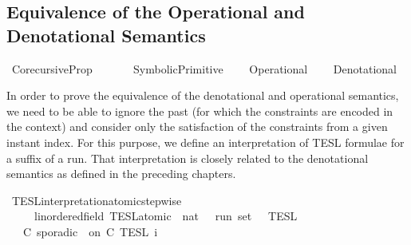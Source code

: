 %
\begin{isabellebody}%
%
%
\begin{isamarkuptext}%
\chapter[Semantics Equivalence]{Equivalence of the Operational and Denotational Semantics}%
\end{isamarkuptext}\isamarkuptrue%
%
\isadelimtheory
%
\endisadelimtheory
%
\isatagtheory
{}\isamarkupfalse%
\ Corecursive{\isacharunderscore}Prop\isanewline
\ \ \isanewline
\ \ \ \ SymbolicPrimitive\isanewline
\ \ \ \ Operational\isanewline
\ \ \ \ Denotational\isanewline
\isanewline
{}%
\endisatagtheory
{\isafoldtheory}%
%
\isadelimtheory
%
\endisadelimtheory
%
\isadelimdocument
%
\endisadelimdocument
%
\isatagdocument
%
\isamarkuptrue%
%
\endisatagdocument
{\isafolddocument}%
%
\isadelimdocument
%
\endisadelimdocument
%
\begin{isamarkuptext}%
In order to prove the equivalence of the denotational and operational semantics, 
  we need to be able to ignore the past (for which the constraints are encoded 
  in the context) and consider only the satisfaction of the constraints from
  a given instant index.
  For this purpose, we define an interpretation of TESL formulae for a suffix of a run.
  That interpretation is closely related to the denotational semantics as
  defined in the preceding chapters.%
\end{isamarkuptext}\isamarkuptrue%
\isamarkupfalse%
\ TESL{\isacharunderscore}interpretation{\isacharunderscore}atomic{\isacharunderscore}stepwise\isanewline
\ \ \ \ {\isacharcolon}{\isacharcolon}\ {\isacartoucheopen}{\isacharparenleft}{\isacharprime}{\isasymtau}{\isacharcolon}{\isacharcolon}linordered{\isacharunderscore}field{\isacharparenright}\ TESL{\isacharunderscore}atomic\ {\isasymRightarrow}\ nat\ {\isasymRightarrow}\ {\isacharprime}{\isasymtau}\ run\ set{\isacartoucheclose}\ {\isacharparenleft}{\isacartoucheopen}{\isasymlbrakk}\ {\isacharunderscore}\ {\isasymrbrakk}\isactrlsub T\isactrlsub E\isactrlsub S\isactrlsub L\isactrlbsup {\isasymge}\ {\isacharunderscore}\isactrlesup {\isacartoucheclose}{\isacharparenright}\isanewline
{}\isanewline
\ \ {\isacartoucheopen}{\isasymlbrakk}\ C\ sporadic\ {\isasymtau}\ on\ C\ {\isasymrbrakk}\isactrlsub T\isactrlsub E\isactrlsub S\isactrlsub L\isactrlbsup {\isasymge}\ i\isactrlesup \ {\isacharequal}\isanewline

\end{isabellebody}
